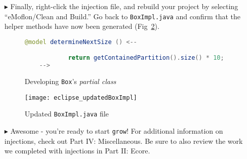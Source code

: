 \begin{itemize}
\vspace{0.5cm}

\item[$\blacktriangleright$] Finally, right-click the injection file, and rebuild your project by selecting ``eMoflon/Clean and Build.'' Go back to
\texttt{BoxImpl.java} and confirm that the helper methods have now been generated (Fig~\ref{fig:eclipse_updatedBoxImpl}).

\vspace{0.5cm}

\begin{figure}[h!]
        \centering
        \begin{lstlisting}[language=Java, keywordstyle={\bfseries\color{purple}}, backgroundcolor=\color{white}]
    @model determineNextSize () <--

            return getContainedPartition().size() * 10;
    -->

        \end{lstlisting}
        \caption{Developing \texttt{Box}'s \emph{partial class}}
        \label{code:determine_inject_file}
    \end{figure}
    \FloatBarrier

\newpage
\vspace*{1cm}

\begin{figure}[htbp]
    \centering
    \texttt{[image: eclipse\_updatedBoxImpl]}
    \caption{Updated \texttt{BoxImpl.java} file}
    \label{fig:eclipse_updatedBoxImpl}
\end{figure}

\vspace{0.5cm}

\item[$\blacktriangleright$] Awesome - you're ready to start \texttt{grow}! For additional information on injections, check out Part IV: Miscellaneous. Be sure
to also review the work we completed with injections in Part II: Ecore.


\end{itemize}